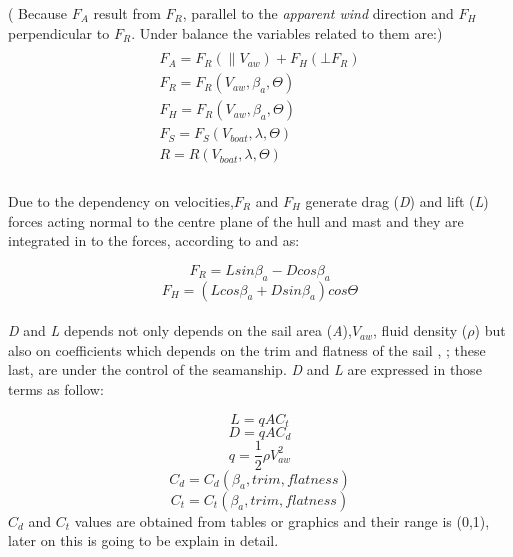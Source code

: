 ( Because $F_{A}$ result from $F_{R}$, parallel to the \textit{apparent wind} direction and $F_{H}$ perpendicular to $F_{R}$. Under balance the variables related to them are:)
\begin{multline}
\\
F_{A}=F_{R}(\parallel V_{aw}) + F_{H}(\bot F_{R} )\\
F_{R}=F_{R}(V_{aw},\beta_{a}, \Theta) \\
F_{H}=F_{R}(V_{aw},\beta_{a}, \Theta) \\
F_{S}=F_{S}(V_{boat},\lambda, \Theta) \\
R=R(V_{boat},\lambda, \Theta)\\  
\end{multline}
\\
Due to the dependency on velocities,$F_{R}$ and $F_{H}$ generate drag (\textit{D}) and lift (\textit{L}) forces acting normal to the centre plane of the hull and mast and they are integrated in to the forces, according to \cite{philpott1993yacht} and \cite{claughton1998sailing} as: \par 
\begin{equation} \label{eq:Fr_LD}
    F_{R}=L sin \beta_{a} - D cos \beta_{a}
\end{equation}
\begin{equation} \label{eq:Fh_LD}
    F_{H}=(L cos \beta_{a} + D sin \beta_{a}) cos\Theta
\end{equation}
\\ \textit{D} and \textit{L} depends not only depends on  the sail area (\textit{A}),$V_{aw}$, fluid density ($\rho$) but also on coefficients which depends on the trim and flatness of the sail \cite{philpott1993yacht}, \cite{carrico17symp}; these last, are under the control of the seamanship. \textit{D} and \textit{L}  are expressed in those terms as follow: \par
\begin{equation} \label{eq:Lift}
  L=qAC_{t}  
\end{equation}
\begin{equation} \label{eq:Draf}
    D=qAC_{d}  
\end{equation}
\begin{equation} \label{eq:dynamic_press}
    q=\frac{1}{2}\rho V_{aw}^2
\end{equation}
\begin{equation} \label{eq:Cd}
    C_{d}=C_{d}(\beta_{a},trim, flatness)
\end{equation}
\begin{equation} \label{eq:Ct}
    C_{t}=C_{t}(\beta_{a},trim, flatness)
\end{equation}
$C_{d}$ and $C_{t}$ values are obtained from tables or graphics and their range is (0,1), later on this is going to be explain in detail. 
